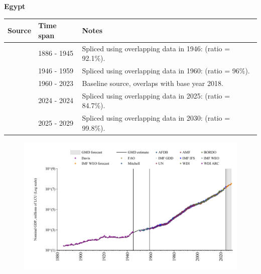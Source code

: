 \documentclass[12pt,a4paper,landscape]{article}
\begin{document}
\begin{adjustbox}{max totalsize={\paperwidth}{\paperheight},center}
\begin{minipage}[t][\textheight][t]{\textwidth}
\vspace*{0.5cm}
{}
\begin{center}
{\Large\bfseries Egypt}
\end{center}
\vspace{0.5cm}
\begin{table}[H]
\centering
\small
\begin{tabular}{|l|l|l|}
\hline
\textbf{Source} & \textbf{Time span} & \textbf{Notes} \\
\hline
\rowcolor{white}\cite{Davis}& 1886 - 1945 &Spliced using overlapping data in 1946: (ratio = 92.1\%).\\
\rowcolor{lightgray}\cite{IMF_GDD}& 1946 - 1959 &Spliced using overlapping data in 1960: (ratio = 96\%).\\
\rowcolor{white}\cite{WDI}& 1960 - 2023 &Baseline source, overlaps with base year 2018.\\
\rowcolor{lightgray}\cite{IMF_IFS}& 2024 - 2024 &Spliced using overlapping data in 2025: (ratio = 84.7\%).\\
\rowcolor{white}\cite{IMF_WEO_forecast}& 2025 - 2029 &Spliced using overlapping data in 2030: (ratio = 99.8\%).\\
\hline
\end{tabular}
\end{table}
\begin{figure}[H]
\centering
\includegraphics[width=\textwidth,height=0.6\textheight,keepaspectratio]{graphs/EGY_nGDP.pdf}
\end{figure}
\end{minipage}
\end{adjustbox}
\end{document}
